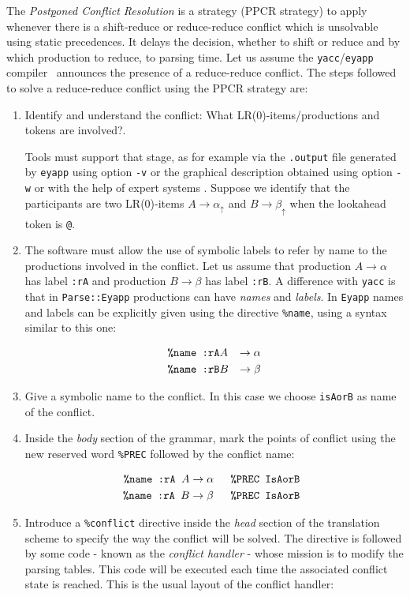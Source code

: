 
The {\it Post\underline{p}oned Conflict Resolution} is a strategy (PPCR strategy)
to apply whenever there is a shift-reduce or reduce-reduce conflict which is
unsolvable using static precedences. It delays the decision, whether to shift
or reduce and by which production to reduce, to parsing time.
Let us assume the \verb|yacc|/\verb|eyapp| \mbox{compiler \cite{Rodriguez:Leon}}
announces  the presence of
a reduce-reduce conflict.
The steps followed to solve a reduce-reduce conflict using the
PPCR strategy are:

\begin{enumerate}
\item
Identify and understand the conflict: What LR(0)-items/productions and tokens are involved?.

Tools must support that stage, as for example via  the \verb|.output| file generated by \verb|eyapp| 
using option \verb|-v| or the graphical description obtained using option \verb|-w| or 
with the help of expert systems \cite{passos,basten}.
Suppose  we identify that the participants are two LR(0)-items \mbox{$A \rightarrow \alpha_\uparrow$}
and
$B \rightarrow \beta_\uparrow$ when the lookahead token is \verb|@|.

\item The software must allow the use of symbolic labels to refer
by name to the productions involved in the conflict.
Let us assume that production $A \rightarrow \alpha$
has label \texttt{:rA} and production $B \rightarrow \beta$
has label \texttt{:rB}.
A difference with \verb|yacc| is that
in \verb|Parse::Eyapp| productions can have {\it names} and {\it labels}.
In \verb|Eyapp| names and labels can be
explicitly given using the directive \verb|%name|, using a syntax similar to this one:

\begin{eqnarray*}
\mbox{{\tt \%name :rA}}& A &\rightarrow \alpha\\
\mbox{{\tt \%name :rB}}& B &\rightarrow \beta 
\end{eqnarray*}


\item
Give a symbolic name to the conflict. In this case we choose \verb|isAorB|
as name of the conflict.

\item
\label{item:mark}
Inside the {\it body} section of the grammar, mark the points of conflict using the
new reserved word \verb|%PREC| followed by the conflict name:

\begin{eqnarray*}
\mbox{{\tt \%name :rA\ }}    A &\rightarrow \alpha &\mbox{\tt\ \%PREC IsAorB }\\
\mbox{{\tt \%name :rA\ }}    B &\rightarrow \beta  &\mbox{\tt\ \%PREC IsAorB }
\end{eqnarray*}
\item
\label{item:handler}
Introduce a \verb|%conflict| directive inside the {\it head} section of
the translation scheme to specify the way the conflict will be solved.
The directive is followed by some code - known as the {\it conflict handler} -
whose mission is to modify
the parsing tables. This code will be executed
each time the associated conflict state is reached.
This is the usual layout of the conflict handler:


\end{enumerate}

